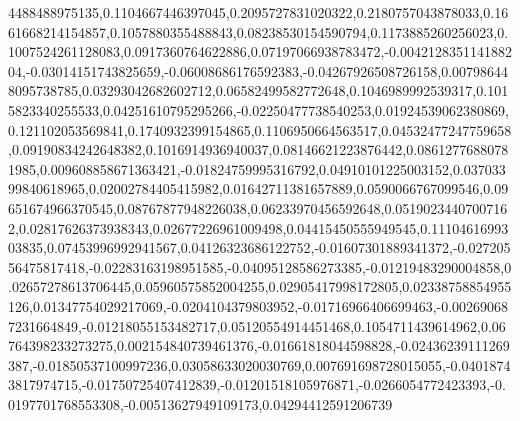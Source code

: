 4488488975135,0.1104667446397045,0.2095727831020322,0.2180757043878033,0.1661668214154857,0.1057880355488843,0.08238530154590794,0.1173885260256023,0.1007524261128083,0.0917360764622886,0.07197066938783472,-0.004212835114188204,-0.03014151743825659,-0.06008686176592383,-0.04267926508726158,0.007986448095738785,0.03293042682602712,0.06582499582772648,0.1046989992539317,0.1015823340255533,0.04251610795295266,-0.02250477738540253,0.01924539062380869,0.121102053569841,0.1740932399154865,0.1106950664563517,0.04532477247759658,0.09190834242648382,0.1016914936940037,0.08146621223876442,0.08612776880781985,0.009608858671363421,-0.01824759995316792,0.04910101225003152,0.03703399840618965,0.02002784405415982,0.01642711381657889,0.0590066767099546,0.09651674966370545,0.08767877948226038,0.06233970456592648,0.05190234407007162,0.02817626373938343,0.02677226961009498,0.04415450555949545,0.1110461699303835,0.07453996992941567,0.04126323686122752,-0.01607301889341372,-0.02720556475817418,-0.02283163198951585,-0.04095128586273385,-0.01219483290004858,0.02657278613706445,0.05960575852004255,0.02905417998172805,0.02338758854955126,0.01347754029217069,-0.0204104379803952,-0.01716966406699463,-0.002690687231664849,-0.01218055153482717,0.05120554914451468,0.1054711439614962,0.06764398233273275,0.002154840739461376,-0.01661818044598828,-0.02436239111269387,-0.01850537100997236,0.03058633020030769,0.007691698728015055,-0.04018743817974715,-0.01750725407412839,-0.01201518105976871,-0.0266054772423393,-0.0197701768553308,-0.00513627949109173,0.04294412591206739
